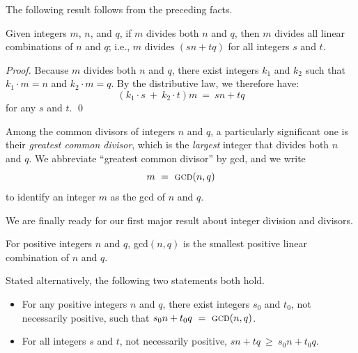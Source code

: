 The following result follows from the preceding facts.

\begin{prop}
\label{thm:m-commondivisor-n-q}
Given integers $m$, $n$, and $q$, if $m$ divides both $n$ and $q$, then $m$ divides all linear combinations of $n$ and $q$; i.e., $m \mbox{ divides } (sn + tq)$ for all integers $s$ and $t$.
\end{prop}

\begin{proof}
Because $m$ divides both $n$ and $q$, 
there exist integers $k_1$ and $k_2$ such that $k_1 \cdot m = n$ and $k_2 \cdot m = q$.  By the distributive law, we therefore have:
\[ (k_1 \cdot s \ + \ k_2 \cdot t)m \ = \ sn+tq \]
for any $s$ and $t$.  \qed
\end{proof}

 
Among the common divisors of integers $n$ and $q$, a particularly significant one is their {\em greatest common divisor}, which is the {\em largest} integer that divides both $n$ and $q$.  We abbreviate ``greatest common divisor'' by {\sc gcd}, and we write
\[ m \ = \ \mbox{\sc gcd}(n, q) \]
to identify an integer $m$ as the {\sc gcd} of $n$ and $q$.

\smallskip

We are finally ready for our first major result about integer division and divisors.


\begin{prop}
\label{thm:gcd-n-linear}
For positive integers $n$ and $q$, {\sc gcd}$(n, q)$ is the smallest positive linear combination of $n$ and $q$.

\medskip

\noindent
Stated alternatively, the following two statements both hold.
\begin{itemize}
\item
For any positive integers $n$ and $q$, there exist integers $s_0$ and $t_0$, not necessarily positive, such that $s_0 n + t_0 q \ = \ \mbox{\sc gcd}(n, q)$.
\item
For all integers $s$ and $t$, not necessarily positive, $s n + t q \ \geq \ s_0 n + t_0 q$.
\end{itemize}
\end{prop}

